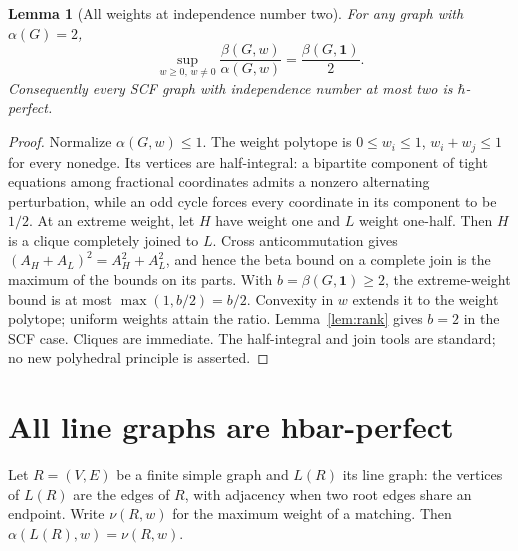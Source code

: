 \documentclass[11pt,a4paper]{article}
\newtheorem{lemma}[theorem]{Lemma}
\theoremstyle{remark}\newtheorem{remark}[theorem]{Remark}
\begin{document}
\begin{lemma}[All weights at independence number two]\label{lem:alpha2}
For any graph with $\alpha(G)=2$,
\[
 \sup_{w\geq0,\,w\ne0}\frac{\beta(G,w)}{\alpha(G,w)}
 =\frac{\beta(G,\mathbf1)}{2}.
\]
Consequently every SCF graph with independence number at most two is
$\hbar$-perfect.
\end{lemma}
\begin{proof}
Normalize $\alpha(G,w)\leq1$. The weight polytope is
$0\leq w_i\leq1$, $w_i+w_j\leq1$ for every nonedge. Its vertices are
half-integral: a bipartite component of tight equations among fractional
coordinates admits a nonzero alternating perturbation, while an odd
cycle forces every coordinate in its component to be $1/2$.
At an extreme weight, let $H$ have weight one and $L$ weight one-half.
Then $H$ is a clique completely joined to $L$. Cross anticommutation
gives $(A_H+A_L)^2=A_H^2+A_L^2$, and hence the beta bound on a complete
join is the maximum of the bounds on its parts. With
$b=\beta(G,\mathbf1)\geq2$, the extreme-weight bound is at most
$\max(1,b/2)=b/2$. Convexity in $w$ extends it to the weight polytope;
uniform weights attain the ratio. Lemma~\ref{lem:rank} gives $b=2$ in
the SCF case. Cliques are immediate. The half-integral and join tools
are standard; no new polyhedral principle is asserted.
\end{proof}

\section{All line graphs are hbar-perfect}\label{sec:line}
Let $R=(V,E)$ be a finite simple graph and $L(R)$ its line graph: the
vertices of $L(R)$ are the edges of $R$, with adjacency when two root
edges share an endpoint. Write $\nu(R,w)$ for the maximum weight of a
matching. Then $\alpha(L(R),w)=\nu(R,w)$.
\end{document}
